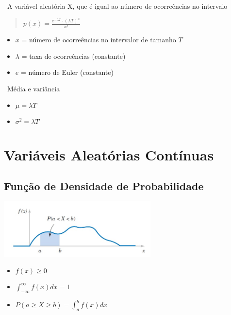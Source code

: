\documentclass{article}
\begin{document}
  \ A variável aleatória X, que é igual ao número de ocorreências no intervalo

  \begin{LARGE}
    \begin{quote}
      $ p(x) = \frac{  e^{- \lambda T} \cdot (\lambda T)^x }{x!} $
    \end{quote}
    \end{LARGE}

  \begin{itemize}
    \item $x$ = número de ocorreências no intervalor de tamanho $ T $
    \item $\lambda$ = taxa de ocorreências (constante)
    \item $e$ = número de Euler (constante)
  \end{itemize}

  \ Média e variância

  \begin{itemize}
    \item $\mu = \lambda T $
    \item $\sigma^2 = \lambda T$
  \end{itemize}
  
\newpage

\section{Variáveis Aleatórias Contínuas}

  \subsection{Função de Densidade de Probabilidade}

  \begin{multicols}{2}
  
    \hbox{\includegraphics[width=8cm]{Função Densidade.jpg}}
    \begin{itemize}
      \item $ f(x) \geqslant 0 $ 
      \item $ \int^{\infty}_{-\infty} f(x)dx = 1$
      \item $ P(a \geqslant X \geqslant b) = \int^{b}_{a} f(x)dx $
    \end{itemize}

  \end{multicols}
  
\end{document}
